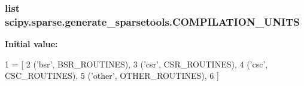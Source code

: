 \subsubsection[{C\+O\+M\+P\+I\+L\+A\+T\+I\+O\+N\+\_\+\+U\+N\+I\+T\+S}]{\setlength{\rightskip}{0pt plus 5cm}list scipy.\+sparse.\+generate\+\_\+sparsetools.\+C\+O\+M\+P\+I\+L\+A\+T\+I\+O\+N\+\_\+\+U\+N\+I\+T\+S}\label{namespacescipy_1_1sparse_1_1generate__sparsetools_a6ef9fac0061967a7ca63ba16e6a7aa9e}
{\bfseries Initial value\+:}
\begin{DoxyCode}
1 = [
2     (\textcolor{stringliteral}{'bsr'}, BSR\_ROUTINES),
3     (\textcolor{stringliteral}{'csr'}, CSR\_ROUTINES),
4     (\textcolor{stringliteral}{'csc'}, CSC\_ROUTINES),
5     (\textcolor{stringliteral}{'other'}, OTHER\_ROUTINES),
6 ]
\end{DoxyCode}
\hypertarget{namespacescipy_1_1sparse_1_1generate__sparsetools_a2bee8bb0ce54b9f73ccc8682d6377e6c}{}
